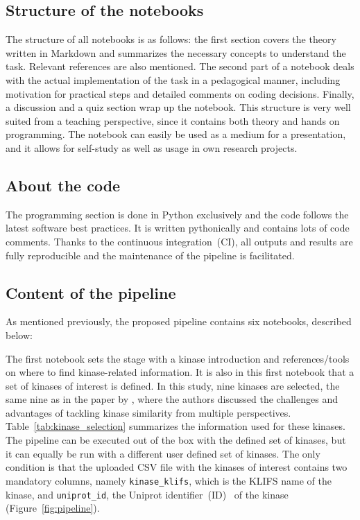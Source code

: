 \documentclass[9pt,training,ASAPversion]{livecoms}
\begin{document}
\subsection{Structure of the notebooks}
The structure of all notebooks is as follows: the first section covers the theory written in Markdown and summarizes the necessary concepts to understand the task. Relevant references are also mentioned. The second part of a notebook deals with the actual implementation of the task in a pedagogical manner, including motivation for practical steps and detailed comments on coding decisions. Finally, a discussion and a quiz section wrap up the notebook.
This structure is very well suited from a teaching perspective, since it contains both theory and hands on programming. The notebook can easily be used as a medium for a presentation, and it allows for self-study as well as usage in own research projects.

\subsection{About the code}
The programming section is done in Python exclusively and the code follows the latest software best practices. It is written pythonically and contains lots of code comments.
Thanks to the continuous integration~(CI), all outputs and results are fully reproducible and the maintenance of the pipeline is facilitated.

\subsection{Content of the pipeline}
As mentioned previously, the proposed pipeline contains six notebooks, described below:

The first notebook sets the stage with a kinase introduction and references/tools on where to find kinase-related information. It is also in this first notebook that a set of kinases of interest is defined. In this study, nine kinases are selected, the same nine as in the paper by \citet{Schmidt_2021_molecules}, where the authors discussed the challenges and advantages of tackling kinase similarity from multiple perspectives. Table~\ref{tab:kinase_selection} summarizes the information used for these kinases.
The pipeline can be executed out of the box with the defined set of kinases, but it can equally be run with a different user defined set of kinases. The only condition is that the uploaded CSV file with the kinases of interest contains two mandatory columns, namely \texttt{kinase\_klifs}, which is the KLIFS name of the kinase, and \texttt{uniprot\_id}, the Uniprot identifier~(ID)~\cite{uniprot_consortium_2020_nar} of the kinase (Figure~\ref{fig:pipeline}).
\end{document}
